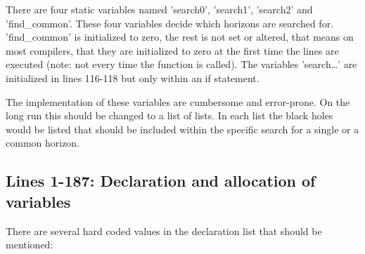 \documentclass[11pt,a4paper,twoside]{article}
\begin{document}
There are four static variables named
'search0', 'search1', 'search2' and 'find\_\-common'.
These four variables decide which horizons are searched for.
'find\_com\-mon' is initialized to zero, the rest is not set or altered, that
means on most compilers, that they are initialized to zero at the
first time the lines are executed (note: not every time the function
is called). The variables 'search\dots' are initialized in lines 116-118
but only within an if statement.

The implementation of these variables are cumbersome and error-prone.
On the long run this should be changed to a list of lists. In each list
the black holes would be listed that should be included within the 
specific search for a single or a common horizon. 

\subsection{Lines 1-187: Declaration and allocation of variables}
There are several hard coded values in the declaration list that should
be mentioned:
\end{document}
